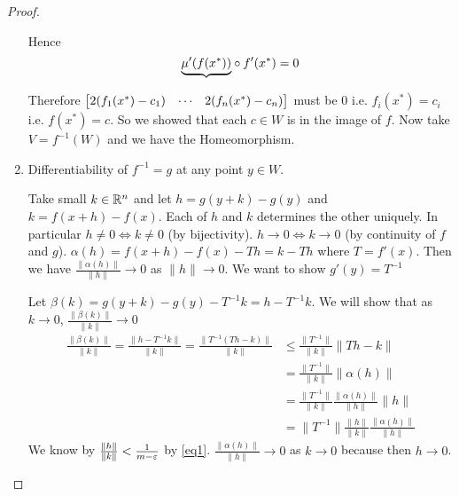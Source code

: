 \begin{proof}
\begin{enumerate}[label=\bfseries\tiny\protect\circled{\small\arabic*}]
\begin{center}
\end{center}
Hence $$\EqM{c1}{\underbrace{\mu'(f(x^*))}}\circ f'(x^*)=0$$

\vspace{1.5cm}

Therefore $\left[\begin{matrix}2(f_1(x^*)-c_1) & \cdots & 2(f_n(x^*)-c_n)\end{matrix}\right]$ must be 0 i.e. $f_i(x^*)=c_i$ i.e. $f(x^*)=c$. So we showed that each $c\in W$ is in the image of $f$. Now take $V=f^{-1}(W)$ and we have the Homeomorphism.


\item Differentiability of $f^{-1}=g$ at any point $y\in W$.

\begin{center}
\end{center}

Take small $k\in\mathbb{R}^n$ and let $h=g(y+k)-g(y)$ and $k=f(x+h)-f(x)$. Each of $h$ and $k$ determines the other uniquely. In particular $h\neq 0\iff k\neq 0$ (by bijectivity). $h\to 0 \iff k\to 0$ (by continuity of $f$ and $g$). $\alpha(h)=f(x+h)-f(x)-Th=k-Th$ where $T=f'(x)$. Then we have $\frac{\|\alpha(h)\|}{\|h\|}\to 0$ as $\|h\|\to 0$. We want to show $g'(y)=T^{-1}$

Let $\beta(k)=g(y+k)-g(y)-T^{-1}k=h-T^{-1}k$. We will show that as $k\to 0$, $\frac{\|\beta(k)\|}{\|k\|}\to 0$\begin{align*}
	\frac{\|\beta(k)\|}{\|k\|} = \frac{\|h-T^{-1}k\|}{\|k\|}= \frac{\|T^{-1}(Th-k)\|}{\|k\|} & \leq \frac{\|T^{-1}\|}{\|k\|}\|Th-k\|\\
	& = \frac{\|T^{-1}\|}{\|k\|} \|\alpha(h)\|\\
	& = \frac{\|T^{-1}\|}{\|k\|} \frac{\|\alpha(h)\|}{\|h\|}\|h\|\\
	& = \|T^{-1}\|\frac{\|h\|}{\|k\|}  \frac{\|\alpha(h)\|}{\|h\|}
\end{align*}
We know by $\frac{\|h\|}{\|k\|} <\frac{1}{m-\varepsilon}$ by  \eqref{eq1}. $\frac{\|\alpha(h)\|}{\|h\|}\to 0$ as $k\to 0$ because then $h\to 0$.
\end{enumerate}
\end{proof}
